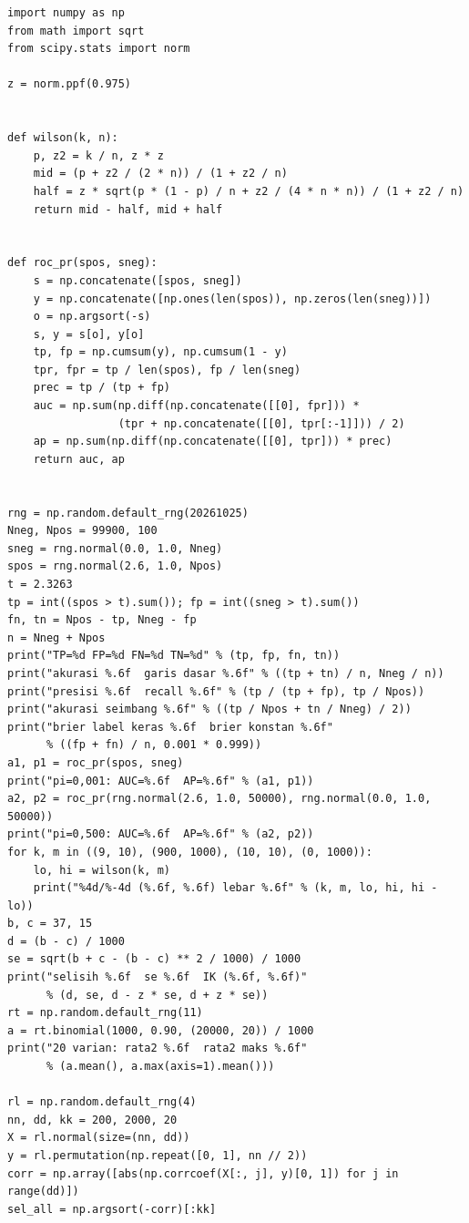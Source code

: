 \begin{lab}
\begin{verbatim}
import numpy as np
from math import sqrt
from scipy.stats import norm

z = norm.ppf(0.975)


def wilson(k, n):
    p, z2 = k / n, z * z
    mid = (p + z2 / (2 * n)) / (1 + z2 / n)
    half = z * sqrt(p * (1 - p) / n + z2 / (4 * n * n)) / (1 + z2 / n)
    return mid - half, mid + half


def roc_pr(spos, sneg):
    s = np.concatenate([spos, sneg])
    y = np.concatenate([np.ones(len(spos)), np.zeros(len(sneg))])
    o = np.argsort(-s)
    s, y = s[o], y[o]
    tp, fp = np.cumsum(y), np.cumsum(1 - y)
    tpr, fpr = tp / len(spos), fp / len(sneg)
    prec = tp / (tp + fp)
    auc = np.sum(np.diff(np.concatenate([[0], fpr])) *
                 (tpr + np.concatenate([[0], tpr[:-1]])) / 2)
    ap = np.sum(np.diff(np.concatenate([[0], tpr])) * prec)
    return auc, ap


rng = np.random.default_rng(20261025)
Nneg, Npos = 99900, 100
sneg = rng.normal(0.0, 1.0, Nneg)
spos = rng.normal(2.6, 1.0, Npos)
t = 2.3263
tp = int((spos > t).sum()); fp = int((sneg > t).sum())
fn, tn = Npos - tp, Nneg - fp
n = Nneg + Npos
print("TP=%d FP=%d FN=%d TN=%d" % (tp, fp, fn, tn))
print("akurasi %.6f  garis dasar %.6f" % ((tp + tn) / n, Nneg / n))
print("presisi %.6f  recall %.6f" % (tp / (tp + fp), tp / Npos))
print("akurasi seimbang %.6f" % ((tp / Npos + tn / Nneg) / 2))
print("brier label keras %.6f  brier konstan %.6f"
      % ((fp + fn) / n, 0.001 * 0.999))
a1, p1 = roc_pr(spos, sneg)
print("pi=0,001: AUC=%.6f  AP=%.6f" % (a1, p1))
a2, p2 = roc_pr(rng.normal(2.6, 1.0, 50000), rng.normal(0.0, 1.0, 50000))
print("pi=0,500: AUC=%.6f  AP=%.6f" % (a2, p2))
for k, m in ((9, 10), (900, 1000), (10, 10), (0, 1000)):
    lo, hi = wilson(k, m)
    print("%4d/%-4d (%.6f, %.6f) lebar %.6f" % (k, m, lo, hi, hi - lo))
b, c = 37, 15
d = (b - c) / 1000
se = sqrt(b + c - (b - c) ** 2 / 1000) / 1000
print("selisih %.6f  se %.6f  IK (%.6f, %.6f)"
      % (d, se, d - z * se, d + z * se))
rt = np.random.default_rng(11)
a = rt.binomial(1000, 0.90, (20000, 20)) / 1000
print("20 varian: rata2 %.6f  rata2 maks %.6f"
      % (a.mean(), a.max(axis=1).mean()))

rl = np.random.default_rng(4)
nn, dd, kk = 200, 2000, 20
X = rl.normal(size=(nn, dd))
y = rl.permutation(np.repeat([0, 1], nn // 2))
corr = np.array([abs(np.corrcoef(X[:, j], y)[0, 1]) for j in range(dd)])
sel_all = np.argsort(-corr)[:kk]



\end{verbatim}
\end{lab}
